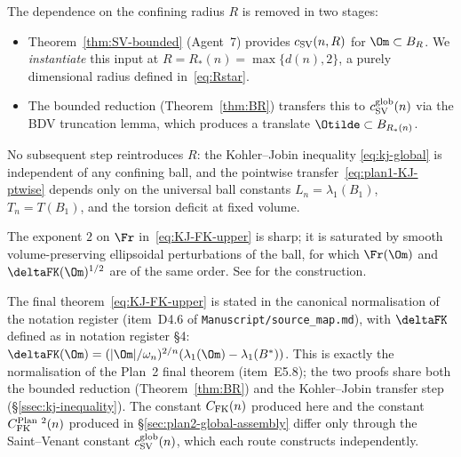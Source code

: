 \begin{remark}\label{rem:R-removal-final}
The dependence on the confining radius $R$ is removed in two stages:
\begin{itemize}
\item Theorem~\ref{thm:SV-bounded} (Agent~7) provides
$c_{\rm SV}(n,R)$ for $\Om\subset B_R$. We \emph{instantiate} this
input at $R=R_*(n)=\max\{d(n),2\}$, a purely dimensional radius
defined in~\eqref{eq:Rstar}.
\item The bounded reduction (Theorem~\ref{thm:BR}) transfers this
to $c_{\rm SV}^{\rm glob}(n)$ via the BDV truncation lemma, which
produces a translate $\Otilde\subset B_{R_*(n)}$.
\end{itemize}
No subsequent step reintroduces $R$: the Kohler--Jobin inequality
\eqref{eq:kj-global} is independent of any confining ball, and the
pointwise transfer~\eqref{eq:plan1-KJ-ptwise} depends only on the
universal ball constants $L_n=\lambda_1(B_1)$, $T_n=T(B_1)$, and the
torsion deficit at fixed volume.
\end{remark}

\begin{remark}
The exponent $2$ on $\Fr$ in~\eqref{eq:KJ-FK-upper} is sharp; it is
saturated by smooth volume-preserving ellipsoidal perturbations of the
ball, for which $\Fr(\Om)$ and $\deltaFK(\Om)^{1/2}$ are of the same
order. See \cite[\S1.2]{BDV} for the construction.
\end{remark}

\begin{remark}\label{rem:plan2-match}
The final theorem~\eqref{eq:KJ-FK-upper} is stated in the canonical
normalisation of the notation register (item~D4.6 of
\texttt{Manuscript/source\_map.md}), with $\deltaFK$ defined as in
notation register \S4: $\deltaFK(\Om)=(|\Om|/\omega_n)^{2/n}(\lambda_1(\Om)-\lambda_1(B^*))$.
This is exactly the normalisation of the Plan~2 final theorem
(item~E5.8); the two proofs share both the bounded reduction
(Theorem~\ref{thm:BR}) and the Kohler--Jobin transfer step
(\S\ref{ssec:kj-inequality}). The constant $C_{\rm FK}(n)$ produced
here and the constant $C_{\rm FK}^{\rm Plan~2}(n)$ produced in
\S\ref{sec:plan2-global-assembly} differ only through the
Saint--Venant constant $c_{\rm SV}^{\rm glob}(n)$, which each route
constructs independently.
\end{remark}

